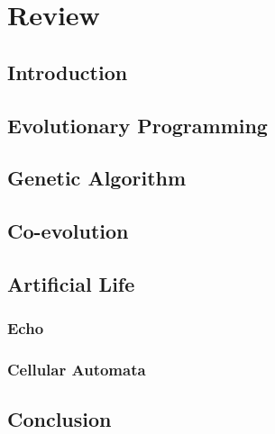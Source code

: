 \chapter{Review}

\section{Introduction}

\section{Evolutionary Programming}

\section{Genetic Algorithm}

\section{Co-evolution}

\section{Artificial Life}

\subsection{Echo}

\subsection{Cellular Automata}

\section{Conclusion}
